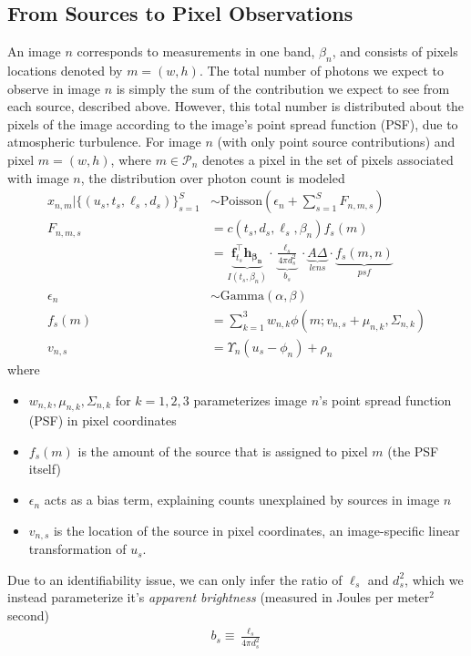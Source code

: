 \documentclass[11pt]{article}
\newcommand{\trans}{\intercal}
\begin{document}
\subsection{From Sources to Pixel Observations}
An image $n$ corresponds to measurements in one band, $\beta_n$, and consists of pixels locations denoted by $m = (w,h)$.  The total number of photons we expect to observe in image $n$ is simply the sum of the contribution we expect to see from each source, described above.  However, this total number is distributed about the pixels of the image according to the image's point spread function (PSF), due to atmospheric turbulence.  For image $n$ (with only point source contributions) and pixel $m = (w,h)$, where $m \in \mathcal{P}_n$ denotes a pixel in the set of pixels associated with image $n$, the distribution over photon count is modeled
\begin{align}
  x_{n,m} | \{(u_s, t_s, \ell_s, d_s)\}_{s=1}^S &\sim \textrm{Poisson}( \epsilon_n + \sum_{s=1}^S F_{n,m,s} ) \\
  F_{n,m,s} 
    &= c(t_s, d_s, \ell_s, \beta_n) f_s(m)  \\
    &= \underbrace{\mathbf{f}_{t_s}^\trans \mathbf{h_{\beta_n}}}_{I(t_s, \beta_n)} \cdot 
       \underbrace{\frac{\ell_s}{4 \pi d_s^2}}_{b_s} \cdot
       \underbrace{A \Delta}_{lens} \cdot 
       \underbrace{f_s(m,n)}_{psf} \\
 \epsilon_n &\sim \textrm{Gamma}(\alpha, \beta) \\
  f_s(m)  &= \sum_{k=1}^3 w_{n,k} \phi(m; v_{n,s} + \mu_{n,k}, \Sigma_{n,k}) \\
  v_{n,s} &= \Upsilon_n(u_s - \phi_n) + \rho_n
\end{align}
where 
\begin{itemize}
  \item $w_{n,k}, \mu_{n,k}, \Sigma_{n,k}$ for $k=1,2,3$ parameterizes image $n$'s point spread function (PSF) in pixel coordinates
  \item $f_s(m)$ is the amount of the source that is assigned to pixel $m$ (the PSF itself)
  \item $\epsilon_n$ acts as a bias term, explaining counts unexplained by sources in image $n$ 
  \item $v_{n,s}$ is the location of the source in pixel coordinates, an image-specific linear transformation of $u_s$. 
\end{itemize}
Due to an identifiability issue, we can only infer the ratio of $\ell_s$ and $d_s^2$, which we instead parameterize it's \emph{apparent brightness} (measured in Joules per meter$^2$ second)
\begin{align}
  b_s \equiv \frac{\ell_s}{4 \pi d_s^2}
\end{align}
\end{document}
